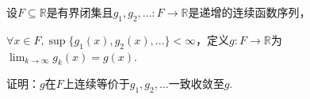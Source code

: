 \begin{comment}
    \begin{problem}[6]\label{2.E.6}
        设\((X, \mathcal{S}, \mu)\)是测度空间且\(\mu(X)<\infty\).
        
        设\(\mathcal{S}-\)可测函数序列\(f_1, f_2, \dots: X \to \mathbb{R}\)满足\(\forall x \in X, \lim_{k \to \infty}f_k(x)=\infty\).

        证明\(\forall \varepsilon>0, \exists E \in \mathcal{S}, \mu(X \setminus E)<\varepsilon\)且\(f_1, f_2, \dots\)在\(E\)上一致收敛至\(\infty\).

        这题是egorov定理的变体，可使用类似的方法证明以作为补充.
    \end{problem}

    \begin{proof}
        固定精度\(t\)，令\(A_{n,t}=\bigcap_{k=n}^\infty f_k^{-1}((t,\infty)) \in \mathcal{S}\)，则\(X=\bigcap_{t=1}^\infty \bigcup_{n=1}^\infty A_{n,t}\).

        由于\(A_{1,t} \subseteq A_{2,t} \subseteq \dots\)且\(\lim_{n \to \infty} A_{n,t}=X\)，故\(\lim_{n \to \infty}\mu(A_{n,t})=\mu(X)\).

        那么\(\forall \varepsilon>0, t \in \mathbb{R}, \exists n_t \in \mathbb{Z}^+, \forall k \geq n_t, \mu(X)-\mu(A_{n_t,t})<\varepsilon/2^t\)，令\(E=\bigcap_{t=1}^\infty A_{n_t,t} \in \mathcal{S}\).
        \begin{align*}
            \mu(X \setminus E)=\mu \left(\bigcup_{t=1}^\infty(X \setminus A_{n_t,t})\right) \leq \sum_{t=1}^\infty \mu(X \setminus A_{n_t,t})<\sum_{t=1}^\infty \frac{\varepsilon}{2^n}=\varepsilon
        \end{align*}
        下证\(f_1, f_2, \dots\)在\(E\)上一致收敛至\(f\).由于\(\forall t \in \mathbb{R}, E \subseteq A_{n_t,t}\)，那么
        \begin{align*}
            \forall t \in \mathbb{R}, x \in E, \exists n_t \in \mathbb{N}, \forall k \geq n_t, f_k(x)>t
        \end{align*}
        这就说明\(f_1, f_2, \dots\)在\(E\)上一致收敛至\(f\).

        {\kaishu \textit{egorov}定理的精髓在于按精度分层而非按点分类，按照精度筛选合格的点集.
        
        取交集得到对所有精度都合格的点集，下连续性保证了抽取子列来满足精度的合法性.}
    \end{proof}
\end{comment}

\begin{problem}[7]\label{2.E.7}
    设\(F \subseteq \mathbb{R}\)是有界闭集且\(g_1, g_2, \dots: F \to \mathbb{R}\)是递增的连续函数序列，

    \(\forall x \in F, \sup\{g_1(x), g_2(x), \dots\}<\infty\)，定义\(g: F \to \mathbb{R}\)为\(\lim_{k \to \infty} g_k(x)=g(x)\).

    证明：\(g\)在\(F\)上连续等价于\(g_1, g_2, \dots\)一致收敛至\(g\).
\end{problem}

